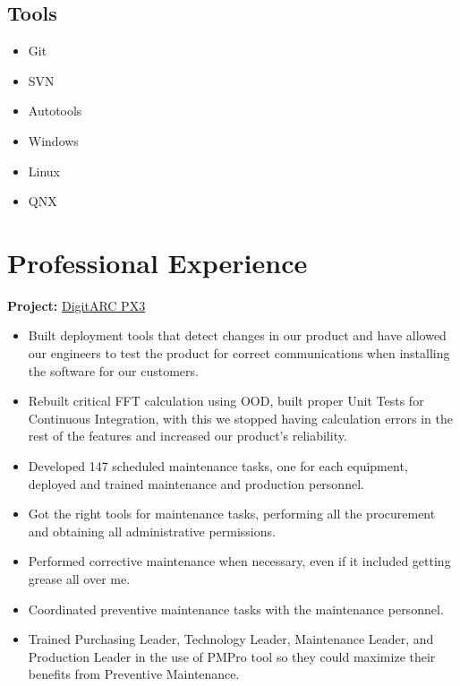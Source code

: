 \documentclass{scrartcl}
\begin{document}
\begin{minipage}[t]{0.28\textwidth}
\begin{flushright}
	
	\subsection*{Tools}
		\begin{itemize}[noitemsep]
			\item Git
			\item SVN
			\item Autotools
			\item Windows
			\item Linux 
			\item QNX
		\end{itemize}
	\end{flushright}
\end{minipage}

\pagebreak
\section*{Professional Experience}


\textbf{Project:} \href{http://amige.com/meltshops_technological_controls_digitarc_px3.html}{DigitARC PX3}
	\begin{itemize}[noitemsep]
		\item Built deployment tools that detect changes in our product and have allowed our engineers to test the product for correct communications when installing the software for our customers.
		\item Rebuilt critical FFT calculation using OOD, built proper Unit Tests for Continuous Integration, with this we stopped having calculation errors in the rest of the features and increased our product's reliability. 
	\end{itemize}


\begin{itemize}[noitemsep]
	\item Developed 147 scheduled maintenance tasks, one for each equipment, deployed and trained maintenance and production personnel.  
	\item Got the right tools for maintenance tasks, performing all the procurement and obtaining all administrative permissions.
	\item Performed corrective maintenance when necessary, even if it included getting grease all over me. 
	\item Coordinated preventive maintenance tasks with the maintenance personnel.
	\item Trained Purchasing Leader, Technology Leader, Maintenance Leader, and Production Leader in the use of PMPro tool so they could maximize their benefits from Preventive Maintenance.  
\end{itemize}
\end{document}
